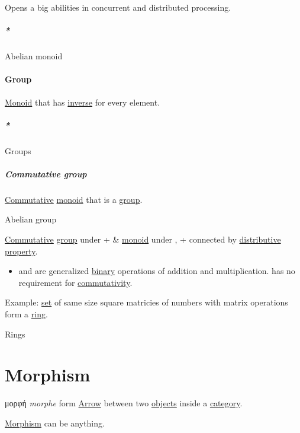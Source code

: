 \documentclass[a4paper,14pt,oneside]{book}
\begin{document}
Opens a big abilities in concurrent and distributed processing.

\subparagraph{\emph{*}}
\label{sec:orgf1ea082}

\label{org2c922de}Abelian monoid

\paragraph{\label{org6b538b3}Group}
\label{sec:orgf820c82}
\hyperref[orgb10cc2a]{Monoid} that has \hyperref[orge2b9b5d]{inverse} for every element.

\subparagraph{\emph{*}}
\label{sec:org6f507cb}

\label{org4450235}Groups

\subparagraph{\label{org29f8f08}Commutative group}
\label{sec:org2ab57a5}
\hyperref[orga351a75]{Commutative} \hyperref[orgb10cc2a]{monoid} that is a \hyperref[org6b538b3]{group}.

\subsubparagraph{\emph{*}}
\label{sec:org828f5e8}

\label{org97aa19c}Abelian group

\label{sec:orgc150b8a}
\hyperref[orga351a75]{Commutative} \hyperref[org6b538b3]{group} under + \& \hyperref[orgb10cc2a]{monoid} under \texttimes{}, + \texttimes{} connected by \hyperref[org6619fb9]{distributive} \hyperref[orgbb6ea59]{property}.

\begin{itemize}
\item and \texttimes{} are generalized \hyperref[orgb210b36]{binary} operations of addition and multiplication. \texttimes{} has no requirement for \hyperref[org0e84ed4]{commutativity}.
\end{itemize}

Example: \hyperref[org128a409]{set} of same size square matricies of numbers with matrix operations form a \hyperref[org58be071]{ring}.

\subsubsubparagraph{\emph{*}}
\label{sec:orgc12a2c6}

\label{org7a1ad57}Rings

\section{\label{org60b7530}Morphism}
\label{sec:orgdce689a}
μορφή \emph{morphe} form
\hyperref[org74f3926]{Arrow} between two \hyperref[orgde02dc0]{objects} inside a \hyperref[orge2e250a]{category}.

\hyperref[org60b7530]{Morphism} can be anything.
\end{document}
